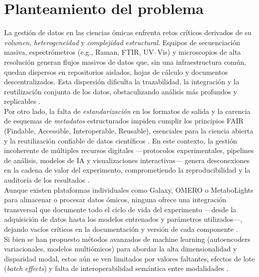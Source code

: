 \section{Planteamiento del problema}
La gestión de datos en las ciencias ómicas enfrenta retos críticos derivados de su \emph{volumen}, \emph{heterogeneidad} y \emph{complejidad estructural}. Equipos de secuenciación masiva, espectrómetros (e.g., Raman, FTIR, UV–Vis) y microscopios de alta resolución generan flujos masivos de datos que, sin una infraestructura común, quedan dispersos en repositorios aislados, hojas de cálculo y documentos descentralizados. Esta dispersión dificulta la trazabilidad, la integración y la reutilización conjunta de los datos, obstaculizando análisis más profundos y replicables \cite{ome_integration}\cite{data_integration_era_omics}.\\

Por otro lado, la falta de \emph{estandarización} en los formatos de salida y la carencia de esquemas de \emph{metadatos} estructurados impiden cumplir los principios FAIR (Findable, Accessible, Interoperable, Reusable), esenciales para la ciencia abierta y la reutilización confiable de datos científicos \cite{wilkinson2016fair_principles}\cite{metadata_barriers_2023}. En este contexto, la gestión incoherente de múltiples recursos digitales —protocolos experimentales, pipelines de análisis, modelos de IA y visualizaciones interactivas— genera desconexiones en la cadena de valor del experimento, comprometiendo la reproducibilidad y la auditoría de los resultados \cite{galaxy2009}\cite{omero2012}.\\

Aunque existen plataformas individuales como Galaxy, OMERO o MetaboLights para almacenar o procesar datos ómicos, ninguna ofrece una integración transversal que documente todo el ciclo de vida del experimento —desde la adquisición de datos hasta los modelos entrenados y parámetros utilizados—, dejando vacíos críticos en la documentación y versión de cada componente \cite{galaxy2009}\cite{omero2012}\cite{biao2025multiomics_review}.\\

Si bien se han propuesto métodos avanzados de machine learning (autoencoders variacionales, modelos multiómicos) para abordar la alta dimensionalidad y disparidad modal, estos aún se ven limitados por valores faltantes, efectos de lote (\emph{batch effects}) y falta de interoperabilidad semántica entre modalidades \cite{biao2025multiomics_review}.\\

